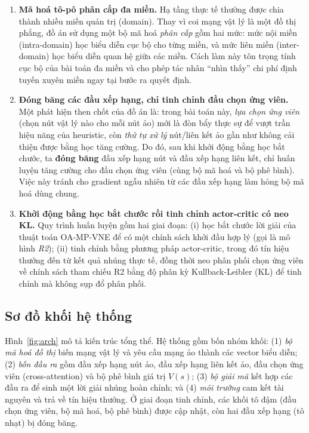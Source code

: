 \documentclass[../DoAn.tex]{subfiles}
\begin{document}
\begin{enumerate}
\item \textbf{Mã hoá tô-pô phân cấp đa miền.} Hạ tầng thực tế thường được chia thành nhiều miền quản trị (domain). Thay vì coi mạng vật lý là một đồ thị phẳng, đồ án sử dụng một bộ mã hoá \textit{phân cấp} gồm hai mức: mức nội miền (intra-domain) học biểu diễn cục bộ cho từng miền, và mức liên miền (inter-domain) học biểu diễn quan hệ giữa các miền. Cách làm này tôn trọng tính cục bộ của bài toán đa miền và cho phép tác nhân ``nhìn thấy'' chi phí định tuyến xuyên miền ngay tại bước ra quyết định.

\item \textbf{Đóng băng các đầu xếp hạng, chỉ tinh chỉnh đầu chọn ứng viên.} Một phát hiện then chốt của đồ án là: trong bài toán này, \textit{lựa chọn ứng viên} (chọn nút vật lý nào cho mỗi nút ảo) mới là đòn bẩy thực sự để vượt trần hiệu năng của heuristic, còn \textit{thứ tự xử lý} nút/liên kết ảo gần như không cải thiện được bằng học tăng cường. Do đó, sau khi khởi động bằng học bắt chước, ta \textbf{đóng băng} đầu xếp hạng nút và đầu xếp hạng liên kết, chỉ huấn luyện tăng cường cho đầu chọn ứng viên (cùng bộ mã hoá và bộ phê bình). Việc này tránh cho gradient ngẫu nhiên từ các đầu xếp hạng làm hỏng bộ mã hoá dùng chung.

\item \textbf{Khởi động bằng học bắt chước rồi tinh chỉnh actor-critic có neo KL.} Quy trình huấn luyện gồm hai giai đoạn: (i) học bắt chước lời giải của thuật toán OA-MP-VNE để có một chính sách khởi đầu hợp lý (gọi là mô hình \textit{R2}); (ii) tinh chỉnh bằng phương pháp actor-critic, trong đó tín hiệu thưởng đến từ kết quả nhúng thực tế, đồng thời neo phân phối chọn ứng viên về chính sách tham chiếu R2 bằng độ phân kỳ Kullback-Leibler (KL) để tinh chỉnh mà không sụp đổ phân phối.
\end{enumerate}

\subsection{Sơ đồ khối hệ thống}
\label{subsec:block-diagram}

Hình~\ref{fig:arch} mô tả kiến trúc tổng thể. Hệ thống gồm bốn nhóm khối: (1) \textit{bộ mã hoá đồ thị} biến mạng vật lý và yêu cầu mạng ảo thành các vector biểu diễn; (2) \textit{bốn đầu ra} gồm đầu xếp hạng nút ảo, đầu xếp hạng liên kết ảo, đầu chọn ứng viên (cross-attention) và bộ phê bình giá trị $V(s)$; (3) \textit{bộ giải mã} kết hợp các đầu ra để sinh một lời giải nhúng hoàn chỉnh; và (4) \textit{môi trường} cam kết tài nguyên và trả về tín hiệu thưởng. Ở giai đoạn tinh chỉnh, các khối tô đậm (đầu chọn ứng viên, bộ mã hoá, bộ phê bình) được cập nhật, còn hai đầu xếp hạng (tô nhạt) bị đóng băng.
\end{document}
